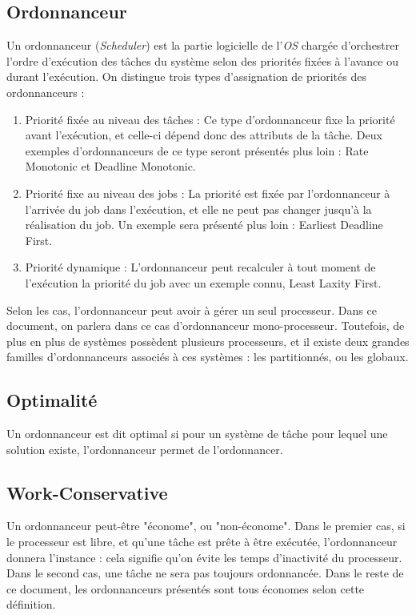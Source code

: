 \documentclass[11pt,a4paper,oneside]{report}
\begin{document}
	\subsection{Ordonnanceur}
	Un ordonnanceur (\textit{Scheduler}) est la partie logicielle de 
	l'\textit{OS} chargée d'orchestrer l'ordre d'exécution des tâches du système 
	selon des priorités fixées à l'avance ou durant l'exécution. 
	On distingue trois types d'assignation de priorités des ordonnanceurs : \medskip
	\begin{enumerate}
		\item Priorité fixée au niveau des tâches : Ce type d'ordonnanceur fixe la priorité 
		avant l'exécution, et celle-ci dépend donc des attributs de la tâche. 
		Deux exemples d'ordonnanceurs de ce type seront présentés plus loin : Rate Monotonic et 
		Deadline Monotonic.
		\item Priorité fixe au niveau des jobs : La priorité est fixée par l'ordonnanceur à l'arrivée du job 
		dans l'exécution, et elle ne peut pas changer jusqu'à la réalisation du job. Un exemple sera présenté plus loin : Earliest Deadline First.
		\item Priorité dynamique : L'ordonnanceur peut recalculer à tout moment de l'exécution 
		la priorité du job avec un exemple connu, Least Laxity First.
	\end{enumerate}
	
	Selon les cas, l'ordonnanceur peut avoir à gérer un seul processeur. Dans ce 
	document, on parlera dans ce cas d'ordonnanceur mono-processeur. Toutefois, de plus en 
	plus de systèmes possèdent plusieurs processeurs, et il existe deux grandes familles 
	d'ordonnanceurs associés à ces systèmes : les partitionnés, ou les globaux. \medskip
	
	\subsection{Optimalité}\label{optimal}
	Un ordonnanceur est dit optimal si pour un système de tâche pour lequel une solution 
	existe, l'ordonnanceur permet de l'ordonnancer.
	
	\subsection{Work-Conservative} 
	Un ordonnanceur peut-être "économe", ou "non-économe". Dans le premier cas, si le processeur est libre, 
	et qu'une tâche est prête à être exécutée, l'ordonnanceur donnera l'instance : cela signifie 
	qu'on évite les temps d'inactivité du processeur. Dans le second cas, une tâche ne sera pas toujours ordonnancée.
	Dans le reste de ce document, les ordonnanceurs présentés sont tous économes selon cette définition.
	
\end{document}
